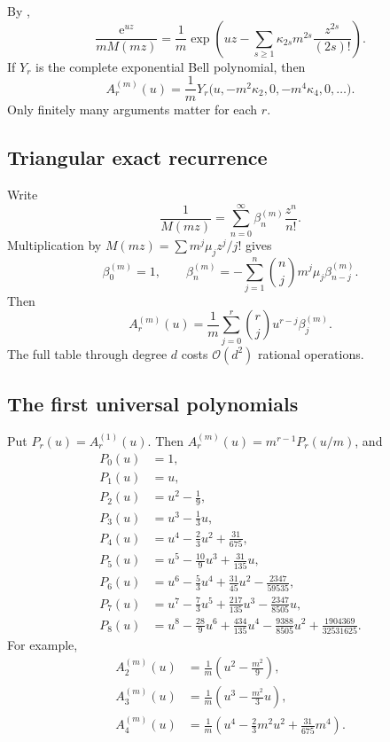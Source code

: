 \documentclass[11pt,oneside]{article}
\theoremstyle{definition}
\theoremstyle{remark}
\newcommand{\e}{\mathrm e}
\newcommand{\bigO}{\mathcal O}
\begin{document}
By ,
\begin{equation}
 \frac{\e^{uz}}{mM(mz)}
 =\frac1m\exp\!\left(
 uz-\sum_{s\ge1}\kappa_{2s}m^{2s}\frac{z^{2s}}{(2s)!}
 \right).
 \label{eq:appell-cumulant-egf}
\end{equation}
If \(Y_r\) is the complete exponential Bell polynomial, then
\begin{equation}
 A_r^{(m)}(u)=\frac1m
 Y_r\bigl(u,-m^2\kappa_2,0,-m^4\kappa_4,0,\ldots\bigr).
 \label{eq:appell-bell}
\end{equation}
Only finitely many arguments matter for each \(r\).

\subsection{Triangular exact recurrence}

Write
\begin{equation}
 \frac1{M(mz)}=\sum_{n=0}^{\infty}\beta_n^{(m)}\frac{z^n}{n!}.
 \label{eq:beta-def}
\end{equation}
Multiplication by \(M(mz)=\sum m^j\mu_jz^j/j!\) gives
\begin{equation}
 \beta_0^{(m)}=1,\qquad
 \beta_n^{(m)}=-\sum_{j=1}^{n}\binom njm^j\mu_j\beta_{n-j}^{(m)}.
 \label{eq:beta-recurrence}
\end{equation}
Then
\begin{equation}
 \boxed{\displaystyle
 A_r^{(m)}(u)=\frac1m\sum_{j=0}^{r}\binom rj
 u^{r-j}\beta_j^{(m)}.}
 \label{eq:appell-beta}
\end{equation}
The full table through degree \(d\) costs \(\bigO(d^2)\) rational operations.

\subsection{The first universal polynomials}

Put \(P_r(u)=A_r^{(1)}(u)\).  Then
\(A_r^{(m)}(u)=m^{r-1}P_r(u/m)\), and
\begin{align*}
P_0(u)&=1,\\
P_1(u)&=u,\\
P_2(u)&=u^2-\frac19,\\
P_3(u)&=u^3-\frac13u,\\
P_4(u)&=u^4-\frac23u^2+\frac{31}{675},\\
P_5(u)&=u^5-\frac{10}{9}u^3+\frac{31}{135}u,\\
P_6(u)&=u^6-\frac53u^4+\frac{31}{45}u^2-\frac{2347}{59535},\\
P_7(u)&=u^7-\frac73u^5+\frac{217}{135}u^3-\frac{2347}{8505}u,\\
P_8(u)&=u^8-\frac{28}{9}u^6+\frac{434}{135}u^4
        -\frac{9388}{8505}u^2+\frac{1904369}{32531625}.
\end{align*}
For example,
\begin{align*}
 A_2^{(m)}(u)&=\frac1m\left(u^2-\frac{m^2}{9}\right),\\
 A_3^{(m)}(u)&=\frac1m\left(u^3-\frac{m^2}{3}u\right),\\
 A_4^{(m)}(u)&=\frac1m\left(u^4-\frac23m^2u^2+\frac{31}{675}m^4\right).
\end{align*}
\end{document}
